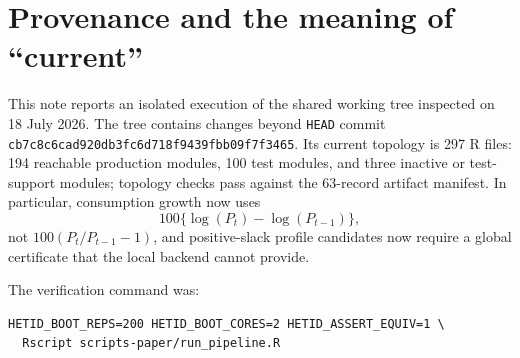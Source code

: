 \documentclass[11pt]{article}
\begin{document}
\begin{abstract}
The current paper pipeline does not complete, so it has no current
positive-slack identified-set result, log-variance result, dynamics result, or
validated final artifact route. This is not a matter of missing files in the
report. The current numerical policy deliberately marks every
positive-slack mean-equation profile as \texttt{unreliable}, because the
available local solver cannot certify a global optimum for the indefinite
quadratic problem. Its tau-star search now reports the typed status
\texttt{unresolved}, with certified lower floor zero and no certified upper
transition. The runner then stops while building the structural-table caption:
that caption requests a removed scalar tau-star field, and the typed formatter
receives \texttt{NULL}.

An isolated run of the current source did reach the upstream mean calculation.
With quarterly log consumption growth, the mean sample has $N=256$ quarters,
1962~Q1--2025~Q4. The closed-form $\tau=0$ news-loading point is approximately
$(0.0156,0.0073,-0.4314)$. All three news-loading rows at every displayed
positive slack are \texttt{unreliable}; no positive-slack endpoint
calibration is available. All 200 bootstrap tau-star statuses were
\texttt{unresolved}, with lower-floor band $[0,0]$. Structural tables,
variance shares, log-OLS, PPML, and every later stage are not reached, so no
later empirical headline is a current pipeline result.
\end{abstract}

\tableofcontents

\section{Provenance and the meaning of ``current''}

This note reports an isolated execution of the shared working tree inspected
on 18 July 2026. The tree contains changes beyond \texttt{HEAD} commit
\texttt{cb7c8c6cad920db3fc6d718f9439fbb09f7f3465}. Its current topology is 297
R files: 194 reachable production modules, 100 test modules, and three
inactive or test-support modules; topology checks pass against the 63-record
artifact manifest. In particular, consumption growth now uses
\[
  100\{\log(P_t)-\log(P_{t-1})\},
\]
not $100(P_t/P_{t-1}-1)$, and positive-slack profile candidates now require a
global certificate that the local backend cannot provide.

The verification command was:
\begin{verbatim}
HETID_BOOT_REPS=200 HETID_BOOT_CORES=2 HETID_ASSERT_EQUIV=1 \
  Rscript scripts-paper/run_pipeline.R
\end{verbatim}
\end{document}
